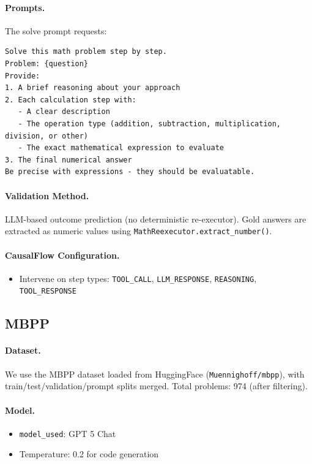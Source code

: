 \documentclass{article}
\theoremstyle{plain}
\theoremstyle{definition}
\theoremstyle{remark}
\begin{document}
\paragraph{Prompts.}
The solve prompt requests:
\begin{verbatim}
Solve this math problem step by step.
Problem: {question}
Provide:
1. A brief reasoning about your approach
2. Each calculation step with:
   - A clear description
   - The operation type (addition, subtraction, multiplication, division, or other)
   - The exact mathematical expression to evaluate
3. The final numerical answer
Be precise with expressions - they should be evaluatable.
\end{verbatim}

\paragraph{Validation Method.}
LLM-based outcome prediction (no deterministic re-executor). Gold answers are extracted as numeric values using \texttt{MathReexecutor.extract\_number()}.

\paragraph{CausalFlow Configuration.}
\begin{itemize}
    \item Intervene on step types: \texttt{TOOL\_CALL}, \texttt{LLM\_RESPONSE}, \texttt{REASONING}, \texttt{TOOL\_RESPONSE}
\end{itemize}

\subsection{MBPP}
\label{app:mbpp}

\paragraph{Dataset.}
We use the MBPP dataset \cite{austin2021program} loaded from HuggingFace (\texttt{Muennighoff/mbpp}), with train/test/validation/prompt splits merged. Total problems: 974 (after filtering).

\paragraph{Model.}
\begin{itemize}
    \item \texttt{model\_used}: GPT 5 Chat
    \item Temperature: 0.2 for code generation
\end{itemize}
\end{document}
